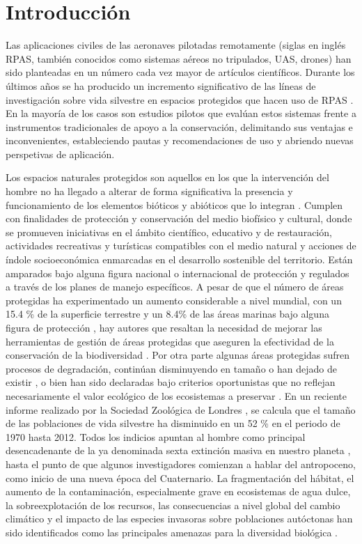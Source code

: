 \documentclass[onecolumn]{extarticle}
\begin{document}
\noindent \doublespacing \section{Introducción}\label{introduccion}

\small

Las aplicaciones civiles de las aeronaves pilotadas remotamente (siglas
en inglés RPAS, también conocidos como sistemas aéreos no tripulados,
UAS, drones) han sido planteadas en un número cada vez mayor de
artículos científicos. Durante los últimos años se ha producido un
incremento significativo de las líneas de investigación sobre vida
silvestre en espacios protegidos que hacen uso de RPAS
\citep{Linchant2015, Christie2016}. En la mayoría de los casos son
estudios pilotos que evalúan estos sistemas frente a instrumentos
tradicionales de apoyo a la conservación, delimitando sus ventajas e
inconvenientes, estableciendo pautas y recomendaciones de uso y abriendo
nuevas perspetivas de aplicación.

Los espacios naturales protegidos son aquellos en los que la
intervención del hombre no ha llegado a alterar de forma significativa
la presencia y funcionamiento de los elementos bióticos y abióticos que
lo integran \citep{Bravo2008}. Cumplen con finalidades de protección y
conservación del medio biofísico y cultural, donde se promueven
iniciativas en el ámbito científico, educativo y de restauración,
actividades recreativas y turísticas compatibles con el medio natural y
acciones de índole socioeconómica enmarcadas en el desarrollo sostenible
del territorio. Están amparados bajo alguna figura nacional o
internacional de protección y regulados a través de los planes de manejo
específicos. A pesar de que el número de áreas protegidas ha
experimentado un aumento considerable a nivel mundial, con un 15.4 \% de
la superficie terrestre y un 8.4\% de las áreas marinas bajo alguna
figura de protección \citep{juffe2014protected} , hay autores que
resaltan la necesidad de mejorar las herramientas de gestión de áreas
protegidas que aseguren la efectividad de la conservación de la
biodiversidad \citep{Chape2005}. Por otra parte algunas áreas protegidas
sufren procesos de degradación, continúan disminuyendo en tamaño o han
dejado de existir \citep{Mascia2011}, o bien han sido declaradas bajo
criterios oportunistas que no reflejan necesariamente el valor ecológico
de los ecosistemas a preservar \citep{Knight2007}. En un reciente
informe realizado por la Sociedad Zoológica de Londres
\citep{Living2016} , se calcula que el tamaño de las poblaciones de vida
silvestre ha disminuido en un 52 \% en el periodo de 1970 hasta 2012.
Todos los indicios apuntan al hombre como principal desencadenante de la
ya denominada sexta extinción masiva en nuestro planeta
\citep{Barnosky2011}, hasta el punto de que algunos investigadores
comienzan a hablar del antropoceno, como inicio de una nueva época del
Cuaternario. La fragmentación del hábitat, el aumento de la
contaminación, especialmente grave en ecosistemas de agua dulce, la
sobreexplotación de los recursos, las consecuencias a nivel global del
cambio climático y el impacto de las especies invasoras sobre
poblaciones autóctonas han sido identificados como las principales
amenazas para la diversidad biológica \citep{Conabio2017}.
\end{document}
